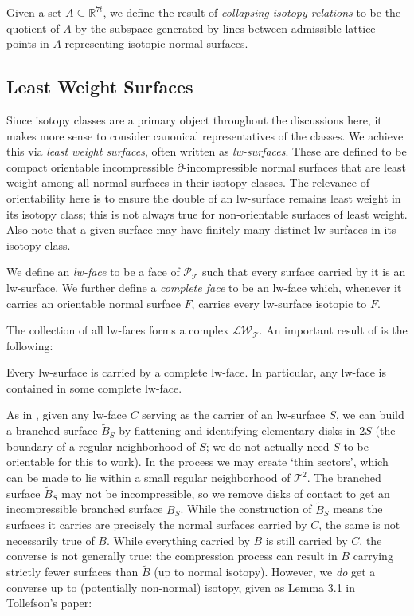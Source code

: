 \documentclass[12pt]{article}
\newcommand{\R}{\mathbb{R}}
\newcommand{\del}{\partial}
\newcommand{\PT}{\mathcal{P_{T}}}
\newcommand{\LWT}{\mathcal{LW_{T}}}
\newcommand{\T}{\mathcal{T}}
\renewcommand{\it}{\textit}
\theoremstyle{nonumberdefinition}
\theoremstyle{empty}
\theoremstyle{empty}
\begin{document}
Given a set $A \subseteq \R^{7t}$, we define the result of \it{collapsing isotopy relations} to be the quotient of $A$ by the subspace generated by lines between admissible lattice points in $A$ representing isotopic normal surfaces. 

\subsection{Least Weight Surfaces}

Since isotopy classes are a primary object throughout the discussions here, it makes more sense to consider canonical representatives of the classes. We achieve this via \it{least weight surfaces}, often written as \it{lw-surfaces}. These are defined to be compact orientable incompressible $\del$-incompressible normal surfaces that are least weight among all normal surfaces in their isotopy classes. The relevance of orientability here is to ensure the double of an lw-surface remains least weight in its isotopy class; this is not always true for non-orientable surfaces of least weight. Also note that a given surface may have finitely many distinct lw-surfaces in its isotopy class.

We define an \it{lw-face} to be a face of $\PT$ such that every surface carried by it is an lw-surface. We further define a \it{complete face} to be an lw-face which, whenever it carries an orientable normal surface $F$, carries every lw-surface isotopic to $F$.

The collection of all lw-faces forms a complex $\LWT$. An important result of \cite{tollefsonIsotopyClassesIncompressible1995} is the following:

\begin{reference}
	Every lw-surface is carried by a complete lw-face. In particular, any lw-face is contained in some complete lw-face. 
\end{reference}

As in \cite{oertelIncompressibleBranchedSurfaces1984, tollefsonIsotopyClassesIncompressible1995}, given any lw-face $C$ serving as the carrier of an lw-surface $S$, we can build a branched surface $\tilde B_S$ by flattening and identifying elementary disks in $2S$ (the boundary of a regular neighborhood of $S$; we do not actually need $S$ to be orientable for this to work). In the process we may create `thin sectors', which can be made to lie within a small regular neighborhood of $\T^2$. The branched surface $\tilde B_S$ may not be incompressible, so we remove disks of contact to get an incompressible branched surface $B_S$. While the construction of $\tilde B_S$ means the surfaces it carries are precisely the normal surfaces carried by $C$, the same is not necessarily true of $B$. While everything carried by $B$ is still carried by $C$, the converse is not generally true: the compression process can result in $B$ carrying strictly fewer surfaces than $\tilde B$ (up to normal isotopy). However, we \it{do} get a converse up to (potentially non-normal) isotopy, given as Lemma 3.1 in Tollefson's paper:
\end{document}
